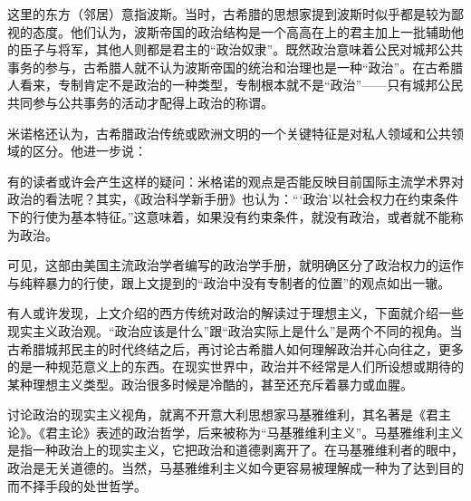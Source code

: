 这里的东方（邻居）意指波斯。当时，古希腊的思想家提到波斯时似乎都是较为鄙视的态度。他们认为，波斯帝国的政治结构是一个高高在上的君主加上一批辅助他的臣子与将军，其他人则都是君主的“政治奴隶”。既然政治意味着公民对城邦公共事务的参与，古希腊人就不认为波斯帝国的统治和治理也是一种“政治”。在古希腊人看来，专制肯定不是政治的一种类型，专制根本就不是“政治”——只有城邦公民共同参与公共事务的活动才配得上政治的称谓。

米诺格还认为，古希腊政治传统或欧洲文明的一个关键特征是对私人领域和公共领域的区分。他进一步说：


有的读者或许会产生这样的疑问：米格诺的观点是否能反映目前国际主流学术界对政治的看法呢？其实，《政治科学新手册》也认为：“‘政治’以社会权力在约束条件下的行使为基本特征。”这意味着，如果没有约束条件，就没有政治，或者就不能称为政治。


可见，这部由美国主流政治学者编写的政治学手册，就明确区分了政治权力的运作与纯粹暴力的行使，跟上文提到的“政治中没有专制者的位置”的观点如出一辙。


有人或许发现，上文介绍的西方传统对政治的解读过于理想主义，下面就介绍一些现实主义政治观。“政治应该是什么”跟“政治实际上是什么”是两个不同的视角。当古希腊城邦民主的时代终结之后，再讨论古希腊人如何理解政治并心向往之，更多的是一种规范意义上的东西。在现实世界中，政治并不经常是人们所设想或期待的某种理想主义类型。政治很多时候是冷酷的，甚至还充斥着暴力或血腥。

讨论政治的现实主义视角，就离不开意大利思想家马基雅维利，其名著是《君主论》。《君主论》表述的政治哲学，后来被称为“马基雅维利主义”。马基雅维利主义是指一种政治上的现实主义，它把政治和道德剥离开了。在马基雅维利者的眼中，政治是无关道德的。当然，马基雅维利主义如今更容易被理解成一种为了达到目的而不择手段的处世哲学。

